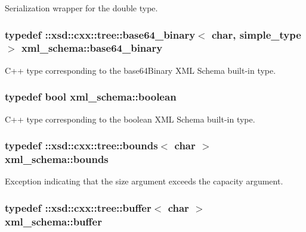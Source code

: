 Serialization wrapper for the double type. 

\hypertarget{namespacexml__schema_a4d35d3537187e95237936654b31ba164}{
\subsubsection[{base64\+\_\+binary}]{\setlength{\rightskip}{0pt plus 5cm}typedef \+::xsd\+::cxx\+::tree\+::base64\+\_\+binary$<$ char, {\bf simple\+\_\+type} $>$ {\bf xml\+\_\+schema\+::base64\+\_\+binary}}}\label{namespacexml__schema_a4d35d3537187e95237936654b31ba164}


C++ type corresponding to the base64\+Binary X\+M\+L Schema built-\/in type. 

\hypertarget{namespacexml__schema_ae5ada4ec9c54b51765c3e4c0e9631bba}{
\subsubsection[{boolean}]{\setlength{\rightskip}{0pt plus 5cm}typedef bool {\bf xml\+\_\+schema\+::boolean}}}\label{namespacexml__schema_ae5ada4ec9c54b51765c3e4c0e9631bba}


C++ type corresponding to the boolean X\+M\+L Schema built-\/in type. 

\hypertarget{namespacexml__schema_a00337f2f08dbcb24280f5cf7b96224ea}{
\subsubsection[{bounds}]{\setlength{\rightskip}{0pt plus 5cm}typedef \+::xsd\+::cxx\+::tree\+::bounds$<$ char $>$ {\bf xml\+\_\+schema\+::bounds}}}\label{namespacexml__schema_a00337f2f08dbcb24280f5cf7b96224ea}


Exception indicating that the size argument exceeds the capacity argument. 

\hypertarget{namespacexml__schema_aff62181c1704f35372302e2acde9b0cc}{
\subsubsection[{buffer}]{\setlength{\rightskip}{0pt plus 5cm}typedef \+::xsd\+::cxx\+::tree\+::buffer$<$ char $>$ {\bf xml\+\_\+schema\+::buffer}}}\label{namespacexml__schema_aff62181c1704f35372302e2acde9b0cc}


